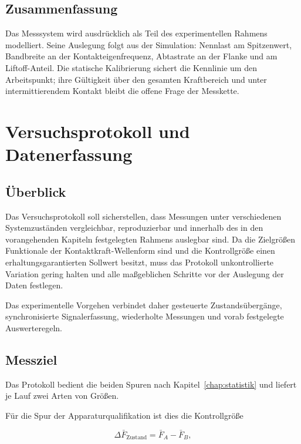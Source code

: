 \documentclass[12pt,a4paper]{report}
\begin{document}
\section{Zusammenfassung}

Das Messsystem wird ausdrücklich als Teil des experimentellen Rahmens
modelliert. Seine Auslegung folgt aus der Simulation: Nennlast am
Spitzenwert, Bandbreite an der Kontakteigenfrequenz, Abtastrate an der
Flanke und am Liftoff-Anteil. Die statische Kalibrierung sichert die
Kennlinie um den Arbeitspunkt; ihre Gültigkeit über den gesamten
Kraftbereich und unter intermittierendem Kontakt bleibt die offene
Frage der Messkette.


\chapter{Versuchsprotokoll und Datenerfassung}
\label{chap:protokoll}

\section{Überblick}

Das Versuchsprotokoll soll sicherstellen, dass Messungen unter
verschiedenen Systemzuständen vergleichbar, reproduzierbar und innerhalb
des in den vorangehenden Kapiteln festgelegten Rahmens auslegbar sind. Da
die Zielgrößen Funktionale der Kontaktkraft-Wellenform sind und die
Kontrollgröße einen erhaltungsgarantierten Sollwert besitzt, muss das
Protokoll unkontrollierte Variation gering halten und alle maßgeblichen
Schritte vor der Auslegung der Daten festlegen.

Das experimentelle Vorgehen verbindet daher gesteuerte
Zustandsübergänge, synchronisierte Signalerfassung, wiederholte Messungen
und vorab festgelegte Auswerteregeln.

\section{Messziel}

Das Protokoll bedient die beiden Spuren nach
Kapitel~\ref{chap:statistik} und liefert je Lauf zwei Arten von Größen.

Für die Spur der Apparaturqualifikation ist dies die Kontrollgröße

\begin{equation}
\Delta \bar{F}_{\text{Zustand}} = \bar{F}_{A} - \bar{F}_{B},
\end{equation}
\end{document}
